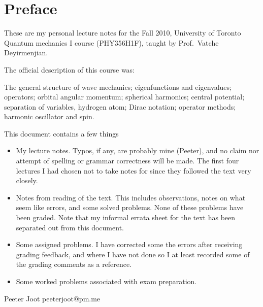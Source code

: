 %
%

%
%
\chapter*{Preface}%
  \thispagestyle{empty}
These are my personal lecture notes for the Fall 2010, University of Toronto Quantum mechanics I course (PHY356H1F), taught by Prof.\ Vatche Deyirmenjian.

The official description of this course was:

The general structure of wave mechanics; eigenfunctions and eigenvalues; operators; orbital angular momentum; spherical harmonics; central potential; separation of variables, hydrogen atom; Dirac notation; operator methods; harmonic oscillator and spin.

This document contains a few things

\begin{itemize}
\item My lecture notes.
Typos, if any, are probably mine (Peeter), and no claim nor attempt of spelling or grammar correctness will be made.  The first four lectures I had chosen not to take notes for since they followed the text \citep{desai2009quantum} very closely.
\item Notes from reading of the text.  This includes observations, notes on what seem like errors, and some solved problems.  None of these problems have been graded.  Note that my informal errata sheet \citep{desaiTypos} for the text has been separated out from this document.
\item Some assigned problems.  I have corrected some the errors after receiving grading feedback, and where I have not done so I at least recorded some of the grading comments as a reference.
\item Some worked problems associated with exam preparation.
\end{itemize}

Peeter Joot  \quad peeterjoot@pm.me
